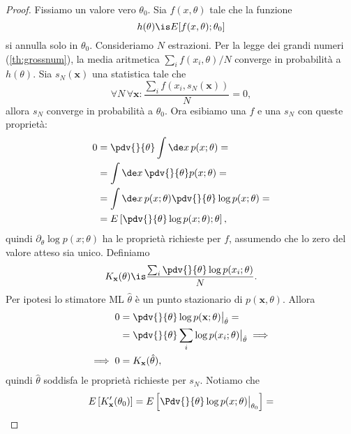 \begin{proof}
	Fissiamo un valore vero $\theta_0$.
	Sia $f(x,\theta)$ tale che la funzione
	\begin{equation*}
		h(\theta)\is E[f(x,\theta);\theta_0]
	\end{equation*}
	si annulla solo in $\theta_0$.
	Consideriamo $N$ estrazioni.
	Per la legge dei grandi numeri (\autoref{th:grossnum}),
	la media aritmetica $\sum_i f(x_i,\theta)/N$ converge in probabilità a $h(\theta)$.
	Sia $s_N(\mathbf x)$ una statistica tale che
	\begin{equation*}
		\forall N \,\forall\mathbf x: \frac{\sum_i f(x_i,s_N(\mathbf x))}N = 0,
	\end{equation*}
	allora $s_N$ converge in probabilità a $\theta_0$.
	Ora esibiamo una $f$ e una $s_N$ con queste proprietà:
	\begin{align*}
		0
		&= \pdv{}{\theta} \int\de x\, p(x;\theta) = \\
		&= \int\de x\, \pdv{}{\theta} p(x;\theta) = \\
		&= \int\de x\, p(x;\theta) \pdv{}{\theta} \log p(x;\theta) = \\
		&= E \left[ \pdv{}{\theta} \log p(x;\theta);\theta \right],
	\end{align*}
	quindi $\partial_\theta \log p(x;\theta)$ ha le proprietà richieste per $f$,
	assumendo che lo zero del valore atteso sia unico.
	Definiamo
	\begin{equation*}
		K_{\mathbf x}(\theta)
		\is \frac{\sum_i \pdv{}{\theta} \log p(x_i;\theta)} N.
	\end{equation*}
	Per ipotesi lo stimatore ML $\hat\theta$ è un punto stazionario di $p(\mathbf x,\theta)$.
	Allora
	\begin{align*}
		0
		&= \pdv{}{\theta} \log p(\mathbf x;\theta) \big|_{\hat\theta} = \\
		&= \pdv{}{\theta} \sum_i \log p(x_i;\theta) \big|_{\hat\theta} \implies \\
		\implies 0
		&= K_{\mathbf x}(\hat\theta),
	\end{align*}
	quindi $\hat\theta$ soddisfa le proprietà richieste per $s_N$.
	Notiamo che
	\begin{align*}
		E \left[ K_{\mathbf x}'(\theta_0) \right]
		&= E \left[ \Pdv{}{\theta} \log p(x;\theta) \big|_{\theta_0} \right] = \\

\end{align*}
\end{proof}
